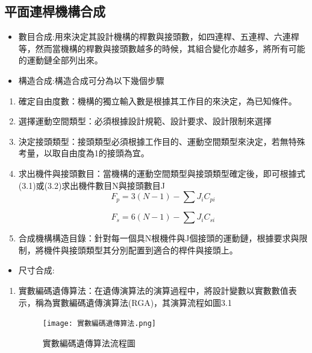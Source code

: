 \documentclass[14pt,a4paper]{report}  %
\newcommand{\fourteen}{\fontsize{14pt}{\baselineskip}\selectfont}%
\begin{document}
{      \fourteen{Cython是結合了Python和C語法的一種語言，使用者可以維持大部分的Python語法，而不需要大幅度調整主要的程式邏輯與演算法。}
      
      
      \subsection{平面連桿機構合成}
      \fourteen{進行機構設計與合成主要流程分為數目合成、構造合成、尺寸合成與運動學模擬，合成皆有其順序性存在，而運動學模擬則是進行分析前面的合成項目。}
      \begin{itemize} 
      \item 數目合成:用來決定其設計機構的桿數與接頭數，如四連桿、五連桿、六連桿等，然而當機構的桿數與接頭數越多的時候，其組合變化亦越多，將所有可能的運動鏈全部列出來。
      \item 構造合成:構造合成可分為以下幾個步驟
      \end{itemize} 
      \begin{enumerate}
      \item 確定自由度數：機構的獨立輸入數是根據其工作目的來決定，為已知條件。
      \item 選擇運動空間類型：必須根據設計規範、設計要求、設計限制來選擇
      \item 決定接頭類型：接頭類型必須根據工作目的、運動空間類型來決定，若無特殊考量，以取自由度為1的接頭為宜。
      \item 求出機件與接頭數目：當機構的運動空間類型與接頭類型確定後，即可根據式(3.1)或(3.2)求出機件數目N與接頭數目J
      \hspace*{\fill} \\
      
      \begin{equation}
      F_{p}=3\left ( N-1 \right )-\sum J_{i}C_{pi}
      \end{equation}  
      
      \begin{equation}
      F_{s}=6\left ( N-1 \right )-\sum J_{i}C_{si}
      \end{equation}  
      \item 合成機構構造目錄：針對每一個具N根機件與J個接頭的運動鏈，根據要求與限制，將機件與接頭類型其分別配置到適合的桿件與接頭上。
      \hspace*{\fill} \\
      \end{enumerate}
      \begin{itemize} 
      \item 尺寸合成:
      \end{itemize} 
      \fourteen {通過隨機變量生成具有路徑限制的機構，生成結構參數來自變數設定，也有其它算法選擇，程式內共包含三種算法：實數編碼遺傳算法、螢火蟲算法與差分進化演算法。}
      \begin{enumerate}
      \item {實數編碼遺傳算法：在遺傳演算法的演算過程中，將設計變數以實數數值表示，稱為實數編碼遺傳演算法(RGA)，其演算流程如圖3.1}
      \begin{figure}[hbt!]
        \centering
        \texttt{[image: 實數編碼遺傳算法.png]} 
        \caption{實數編碼遺傳算法流程圖}
        \label{fig:scale}
        \end{figure}
        

\end{enumerate}}
\end{document}

